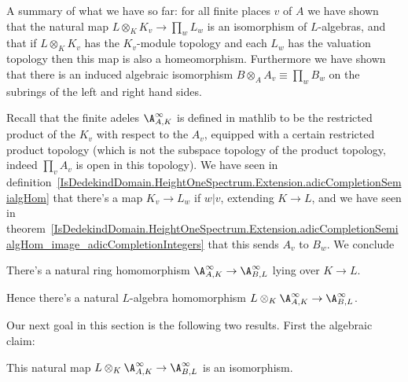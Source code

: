A summary of what we have so far: for all finite places $v$ of $A$
we have shown that the natural map $L\otimes_KK_v\to\prod_wL_w$
is an isomorphism of $L$-algebras, and that if $L\otimes_KK_v$ has
the $K_v$-module topology and each $L_w$ has the valuation topology
then this map is also a homeomorphism. Furthermore we have shown
that there is an induced algebraic isomorphism $B\otimes_AA_v\equiv\prod_w B_w$
on the subrings of the left and right hand sides.

Recall that the finite adeles $\A_{A,K}^\infty$ is defined in mathlib to be
the restricted product of the $K_v$ with respect to the $A_v$, equipped with a certain
restricted product topology (which is not the subspace topology of the product
topology, indeed $\prod_v A_v$ is open in this topology). We have seen in
definition~\ref{IsDedekindDomain.HeightOneSpectrum.Extension.adicCompletionSemialgHom} that
there's a map $K_v\to L_w$ if $w|v$, extending $K\to L$, and we have seen in
theorem~\ref{IsDedekindDomain.HeightOneSpectrum.Extension.adicCompletionSemialgHom_image_adicCompletionIntegers}
that this sends $A_v$ to $B_w$. We conclude

\begin{definition}
  \label{IsDedekindDomain.FiniteAdeleRing.mapSemialgHom}
  \leanok
  There's a natural ring homomorphism
  $\A_{A,K}^\infty\to\A_{B,L}^\infty$ lying over $K\to L$.
\end{definition}

Hence there's a natural $L$-algebra homomorphism $L\otimes_K\A_{A,K}^\infty\to\A_{B,L}^\infty$.

Our next goal in this section is the following two results. First the algebraic claim:

\begin{theorem}
  \label{IsDedekindDomain.FiniteAdeleRing.baseChangeAlgEquiv}
  \leanok
  This natural map $L\otimes_K\A_{A,K}^\infty\to\A_{B,L}^\infty$ is an isomorphism.
\end{theorem}

